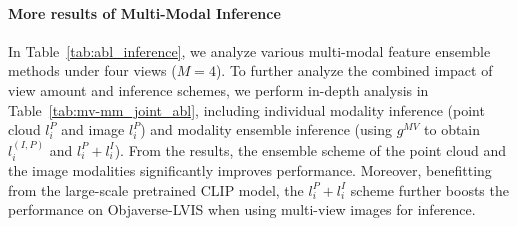 \documentclass{article} \usepackage{iclr2024_conference,times}
\begin{document}
\paragraph{More results of Multi-Modal Inference}
In Table~\ref{tab:abl_inference}, we analyze various multi-modal feature ensemble methods under four views ($M=4$).
To further analyze the combined impact of view amount and inference schemes, we perform in-depth analysis in Table~\ref{tab:mv-mm_joint_abl}, including individual modality inference (point cloud $l_{i}^P$ and image $l_{i}^P$) and modality ensemble inference (using $g^{MV}$ to obtain $l_{i}^{(I,P)}$ and $l_{i}^P + l_{i}^I$).
From the results, the ensemble scheme of the point cloud and the image modalities significantly improves performance.
Moreover, benefitting from the large-scale pretrained CLIP model, the $l_{i}^P + l_{i}^I$ scheme further boosts the performance on Objaverse-LVIS when using multi-view images for inference.
\end{document}
